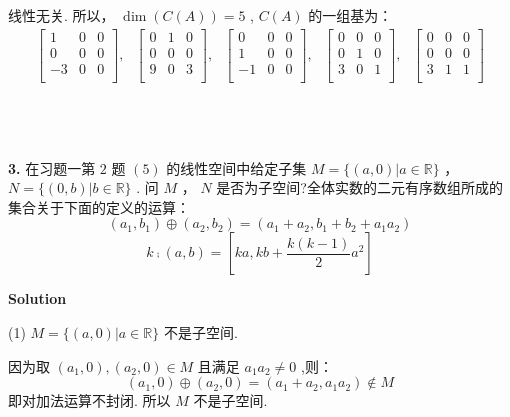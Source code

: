 \documentclass[11pt,a4paper,openany,oneside]{book}
\newcommand\Solution{\noindent\textbf{\textsf{Solution}}\par\medskip}
\begin{document}
线性无关. 所以， $ \dim (C(A))= 5 $ ,  $ C(A) $ 的一组基为：
\begin{gather*}
\begin{bmatrix}
1 &  0  &  0  \\
0 &  0  &  0  \\
-3 &  0  &  0  \\
\end{bmatrix},
\ \ \ 
\begin{bmatrix}
0 &  1  &  0  \\
0 &  0  &  0  \\
9 &  0  &  3  \\
\end{bmatrix},
\ \ \ 
\begin{bmatrix}
0 &  0  &  0  \\
1 &  0  &  0  \\
-1&  0  &  0  \\
\end{bmatrix},
\ \ \ 
\begin{bmatrix}
0 &  0  &  0  \\
0 &  1  &  0  \\
3 &  0  &  1  \\
\end{bmatrix},
\ \ \ 
\begin{bmatrix}
0 &  0  &  0  \\
0 &  0  &  0  \\
3 &  1  &  1  \\
\end{bmatrix}
\end{gather*} \\  \\  \\  



\begin{myexample}
	\textbf{3.} 
在习题一第 $ 2 $ 题 $ (5) $ 的线性空间中给定子集 $ M = \{(a, 0) | a \in \mathbb{R} \} $ ， $ N = \{(0, b)| b \in \mathbb{R} \} $ . 问 $ M $ ， $ N $ 是否为子空间?全体实数的二元有序数组所成的集合关于下面的定义的运算：
 $$  (a_1, b_1) \oplus  (a_2, b_2) = (a_1 + a_2, b_1 + b_2 + a_1a_2)  $$ 
 $$  k \comp (a, b) = \left[ ka, kb+\dfrac{k(k-1)}{2}a^2\right]  $$ 

\end{myexample}
\Solution

(1)  $ M = \{(a, 0) | a \in \mathbb{R} \} $  不是子空间. 

因为取 $  (a_1, 0), (a_2, 0) \in M  $  且满足 $ a_1a_2 \neq 0 $ ,则：
 $$  (a_1, 0) \oplus  (a_2, 0) = (a_1 + a_2, a_1a_2) \notin  M  $$ 
即对加法运算不封闭. 所以 $ M $ 不是子空间. \\
\end{document}
